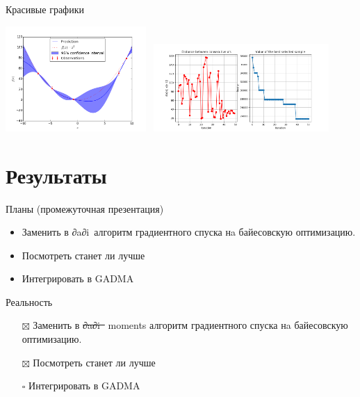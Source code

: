 \documentclass[
  russian,
  ignorenonframetext,
]{beamer}
\providecommand{\tightlist}{%
  \setlength{\itemsep}{0pt}\setlength{\parskip}{0pt}}
\begin{document}
\begin{frame}{Красивые графики}
\protect\hypertarget{ux43aux440ux430ux441ux438ux432ux44bux435-ux433ux440ux430ux444ux438ux43aux438}{}

\includegraphics[width=0.4\textwidth,height=\textheight]{./pics/bayes.png}
~\includegraphics[width=0.5\textwidth,height=\textheight]{./pics/conv.png}

\end{frame}

\hypertarget{ux440ux435ux437ux443ux43bux44cux442ux430ux442ux44b}{%
\section{Результаты}\label{ux440ux435ux437ux443ux43bux44cux442ux430ux442ux44b}}

\begin{frame}{Планы (промежуточная презентация)}
\protect\hypertarget{ux43fux43bux430ux43dux44b-ux43fux440ux43eux43cux435ux436ux443ux442ux43eux447ux43dux430ux44f-ux43fux440ux435ux437ux435ux43dux442ux430ux446ux438ux44f}{}

\begin{itemize}
\tightlist
\item
  Заменить в ∂a∂i\ алгоритм градиентного спуска нa байесовскую
  оптимизацию.
\item
  Посмотреть станет ли лучше
\item
  Интегрировать в GADMA
\end{itemize}

\end{frame}

\begin{frame}{Реальность}
\protect\hypertarget{ux440ux435ux430ux43bux44cux43dux43eux441ux442ux44c}{}

\begin{itemize}
\tightlist
\item[$\boxtimes$]
  Заменить в \sout{∂a∂i\ } moments алгоритм градиентного спуска нa
  байесовскую оптимизацию.
\item[$\boxtimes$]
  Посмотреть станет ли лучше
\item[$\square$]
  Интегрировать в GADMA
\end{itemize}

\end{frame}
\end{document}

